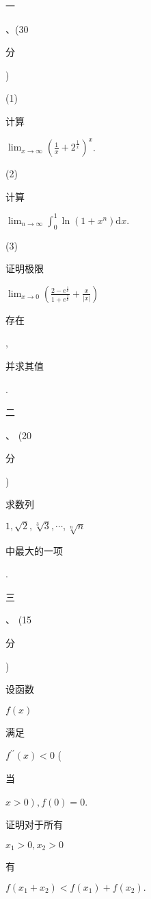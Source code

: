 \documentclass[10pt]{article}
\begin{document}
\begin{CJK}{UTF8}{mj}一\end{CJK}、(30 \begin{CJK}{UTF8}{mj}分\end{CJK})

(1) \begin{CJK}{UTF8}{mj}计算\end{CJK} $\lim _{x \rightarrow \infty}\left(\frac{1}{x}+2^{\frac{1}{x}}\right)^{x}$.

(2) \begin{CJK}{UTF8}{mj}计算\end{CJK} $\lim _{n \rightarrow \infty} \int_{0}^{1} \ln \left(1+x^{n}\right) \mathrm{d} x$.

(3) \begin{CJK}{UTF8}{mj}证明极限\end{CJK} $\lim _{x \rightarrow 0}\left(\frac{2-e^{\frac{1}{x}}}{1+e^{\frac{2}{x}}}+\frac{x}{|x|}\right)$ \begin{CJK}{UTF8}{mj}存在\end{CJK}, \begin{CJK}{UTF8}{mj}并求其值\end{CJK}.

\begin{CJK}{UTF8}{mj}二\end{CJK}、 (20 \begin{CJK}{UTF8}{mj}分\end{CJK}) \begin{CJK}{UTF8}{mj}求数列\end{CJK} $1, \sqrt{2}, \sqrt[3]{3}, \cdots, \sqrt[n]{n}$ \begin{CJK}{UTF8}{mj}中最大的一项\end{CJK}.

\begin{CJK}{UTF8}{mj}三\end{CJK}、 (15 \begin{CJK}{UTF8}{mj}分\end{CJK}) \begin{CJK}{UTF8}{mj}设函数\end{CJK} $f(x)$ \begin{CJK}{UTF8}{mj}满足\end{CJK} $f^{\prime \prime}(x)<0$ (\begin{CJK}{UTF8}{mj}当\end{CJK} $\left.x>0\right), f(0)=0$. \begin{CJK}{UTF8}{mj}证明对于所有\end{CJK} $x_{1}>0, x_{2}>0$ \begin{CJK}{UTF8}{mj}有\end{CJK} $f\left(x_{1}+x_{2}\right)<f\left(x_{1}\right)+f\left(x_{2}\right) .$
\end{document}
